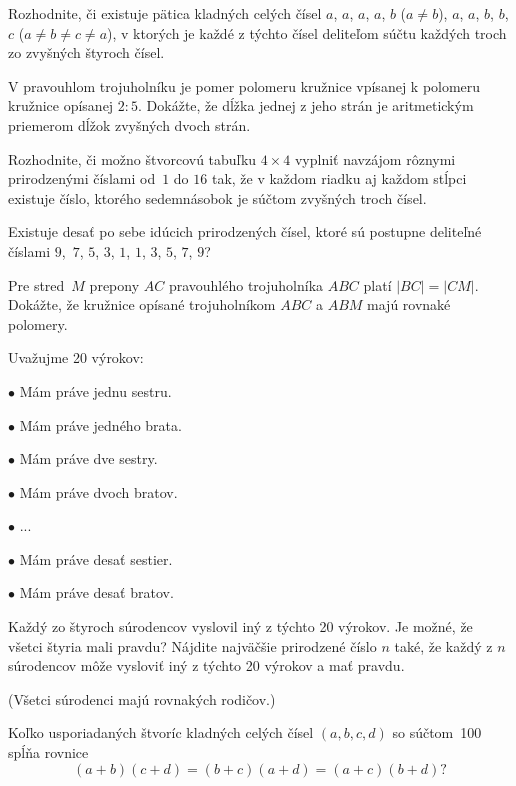 {%
Rozhodnite, či existuje pätica kladných celých čísel
 $a$, $a$, $a$, $a$, $b$ ($a \ne b$),
 $a$, $a$, $b$, $b$, $c$ ($a \ne b \ne c \ne a$),
\endgraf
v ktorých je každé z týchto čísel deliteľom súčtu každých troch zo zvyšných štyroch čísel.}

{%
V pravouhlom trojuholníku je pomer polomeru kružnice vpísanej k polomeru kružnice opísanej $2:5$. Dokážte, že dĺžka jednej z jeho strán je aritmetickým priemerom dĺžok zvyšných dvoch strán.}

{%
Rozhodnite, či možno štvorcovú tabuľku
$4\times4$ vyplniť navzájom rôznymi prirodzenými číslami od~$1$ do $16$ tak,
že v každom riadku aj každom stĺpci existuje číslo, ktorého sedemnásobok je súčtom zvyšných troch čísel.}

{%
Existuje desať po sebe idúcich prirodzených čísel, ktoré sú postupne deliteľné číslami $9$,~$7$, $5$, $3$, $1$, $1$, $3$, $5$, $7$, $9$?}

{%
Pre stred~$M$ prepony $AC$ pravouhlého trojuholníka $ABC$ platí $|BC| = |CM|$. Dokážte, že kružnice opísané trojuholníkom $ABC$ a $ABM$ majú rovnaké polomery.}

{%
Uvažujme 20 výrokov:
\item{$\bullet$} Mám práve jednu sestru.
\item{$\bullet$} Mám práve jedného brata.
\item{$\bullet$} Mám práve dve sestry.
\item{$\bullet$} Mám práve dvoch bratov.
\item{$\bullet$} ...
\item{$\bullet$} Mám práve desať sestier.
\item{$\bullet$} Mám práve desať bratov.

 Každý zo štyroch súrodencov vyslovil iný z týchto 20 výrokov. Je možné, že všetci štyria mali pravdu?
 Nájdite najväčšie prirodzené číslo $n$ také, že každý z $n$ súrodencov môže vysloviť iný z týchto 20 výrokov a mať pravdu.

(Všetci súrodenci majú rovnakých rodičov.)}

{%
Koľko usporiadaných štvoríc kladných celých čísel $(a,b,c,d)$ so súčtom~100 spĺňa rovnice
$$
(a+b)(c+d) = (b+c)(a+d) = (a+c)(b+d)?
$$
}

